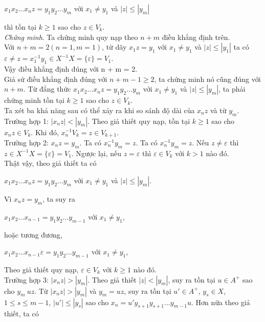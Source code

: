 $x_1x_2...x_nz = y_1y_2...y_m$ với $x_1 \ne y_1$ và $|z| \le |y_m|$
\begin{flushleft}
thì tồn tại $k \ge 1 $ sao cho $z \in V_k$.\\
\textit{Chứng minh}. Ta chứng minh quy nạp theo $n + m$ điều khẳng định trên.\\
\hspace{10mm}Với $n+m = 2 (n = 1, m = 1)$, từ dãy $x_1z = y_1$ với $x_1 \ne y_1$ và $|z| \le |y_1|$ ta có $\varepsilon \ne z = x_1^{-1}y_1 \in X^{-1}X = \{ \varepsilon \} = V_1$.\\
\hspace{10mm}Vậy điều khẳng định đúng với n + m = 2.\\
\hspace{10mm}Giả sử điều khẳng định đúng với $n + m -1 \ge 2$, ta chứng minh nó cũng đúng với $n + m$. Từ đẳng thức $x_1x_2...x_nz = y_1y_2...y_m$ với $x_1 \ne y_1$ và $|z| \le |y_m|$, ta phải chứng minh tồn tại $k \ge 1$ sao cho $z \in V_k$.\\
\hspace{10mm}Ta xét ba khả năng sau có thể xảy ra khi so sánh độ dài của $x_nz$ và từ $y_m$.\\
\hspace{10mm}Trường hợp 1: $|x_nz| < |y_m|$. Theo giả thiết quy nạp, tồn tại $k \ge 1$ sao cho $x_nz \in V_k$.
Khi đó, $x_n^{-1}V_k = z \in V_{k+1}$.\\
\hspace{10mm}Trường hợp 2: $x_nz = y_m$. Ta có $x_n^{-1}y_m = z$. Ta có $x_n^{-1}y_m = z$. Nếu $z \ne \varepsilon$ thì $z \in X^{-1}X = \{ \varepsilon \} = V_1$. Ngược lại, nếu $z = \varepsilon$ thì $\varepsilon \in V_k$ với $k > 1$ nào đó.\\
\hspace{10mm} Thật vậy, theo giả thiết ta có 
\end{flushleft}
$x_1x_2...x_nz = y_1y_2...y_m$ với $x_1 \ne y_1$ và $|z| \le |y_m|$.
\begin{flushleft}
Vì $x_nz = y_m$, ta suy ra
\end{flushleft} 
$x_1x_2...x_{n-1} = y_1y_2...y_{m-1}$ với $x_1 \ne y_1$,
\begin{flushleft}
hoặc tương đương,
\end{flushleft}
$x_1x_2...x_{n-1}\varepsilon = y_1y_2...y_{m-1}$ với $x_1 \ne y_1$,
\begin{flushleft}
Theo giả thiết quy nạp, $\varepsilon \in V_k$ với $k \ge 1$ nào đó.\\
\hspace{10mm}Trường hợp 3: $|x_nz| > |y_m|$. Theo giả thiết $|z| < |y_m|$, suy ra tồn tại $u \in A^+$ sao cho $y_m \ uz$. Từ $|x_nz| > |y_m|$ và $y_m = uz$, suy ra tồn tại $u' \in A^+$, $y_s \in X$, $1 \le s \le m - 1$, $|u'| \le |y_s|$ sao cho $x_n = u'y_{s+1}y_{s+1}...y_{m-1}u$.
\hspace{10mm}Hơn nữa theo giả thiết, ta có 
\end{flushleft}
